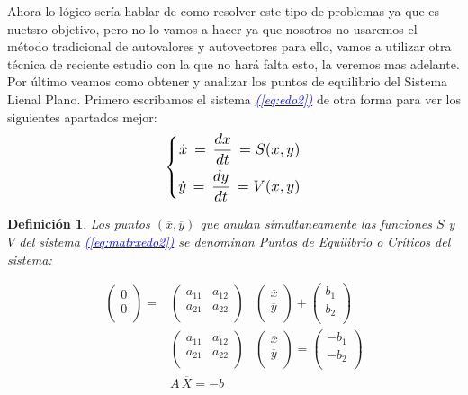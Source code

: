 \documentclass[12pt,a4paper]{report} %
\newtheorem{definicion}{Definición}[chapter] %
\newcommand{\eref}[1]{\hyperref[#1]{\textcolor{blue}{\textit{(\ref*{#1})}}}}
\begin{document}
	Ahora lo lógico sería hablar de como resolver este tipo de problemas ya que es nuetsro objetivo, pero no lo vamos a hacer ya que nosotros no usaremos el método tradicional de autovalores y autovectores para ello, vamos a utilizar otra técnica de reciente estudio con la que no hará falta esto, la veremos mas adelante.\\[0.5cm]
	Por último veamos como obtener y analizar los puntos de equilibrio del Sistema Lienal Plano. Primero escribamos el sistema \eref{eq:edo2} de otra forma para ver los siguientes apartados mejor:
	\begin{equation}
		\label{eq:sv}
		\scalebox{1.2}{$\displaystyle
			\left\{
			\begin{aligned}
				\dot{x}\,=\,\frac{dx}{dt}\,=S(x,y) \\
				\dot{y}\,=\,\frac{dy}{dt}\,=V(x,y)
			\end{aligned}
			\right.
			$}
	\end{equation}\smallskip
	
	\begin{definicion}
		Los puntos $(\overline{x},\overline{y})$ que anulan simultaneamente las funciones $S$ y $V$ del sistema \eref{eq:matrxedo2} se denominan Puntos de Equilibrio o Críticos del sistema:
	\end{definicion}

	\begin{eqnarray}
		\label{eq:crit}
			\begin{pmatrix}
				0\\
				0\\
			\end{pmatrix} =
			&\begin{pmatrix}
				a_{11} & a_{12}\\
				a_{21} & a_{22}\\
			\end{pmatrix}&
			\begin{pmatrix}
				\overline{x}\\
				\overline{y}\\
			\end{pmatrix} + 
			\begin{pmatrix}
				b_1\\
				b_2\\
			\end{pmatrix}\nonumber \\[4mm]
			&\begin{pmatrix}
			a_{11} & a_{12}\\
			a_{21} & a_{22}\\
			\end{pmatrix}&
			\begin{pmatrix}
			\overline{x}\\
			\overline{y}\\
			\end{pmatrix} = 
			\begin{pmatrix}
			-b_1\\
			-b_2\\
			\end{pmatrix} \nonumber \\[4mm]
			&A\,\overline{X}=-b
	\end{eqnarray}\smallskip
	
\end{document}
